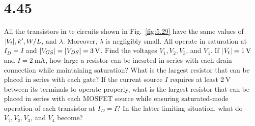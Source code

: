 \documentclass[12pt, a4paper]{article}
\begin{document}
\section{4.45}
All the transistors in te circuits shown in Fig.~\ref{fig:5.29} have the
same values of $\lvert V_t\rvert, k', W/L$, and $\lambda$. Moreover, $\lambda$ is
negligibly small. All operate in saturation at $I_D = I$ and $\abs{V_{GS}}
 = \abs{V_{DS}} = \SI{3}{\V}$. Find the voltages $V_1, V_2, V_3$, and $V_4$.
If $\abs{V_t} = \SI{1}{\V}$ and $I = \SI{2}{\mA}$, how large a resistor can
be inesrted in series with each drain connection while maintaining saturation?
What is the largest resistor that can be placed in series with each gate?
If the current source $I$ requires at least $\SI{2}{\V}$ between its terminals
to operate properly, what is the largest resistor that can be placed in series
with each MOSFET source while ensuring saturated-mode operation of each
transistor at $I_D = I$? In the latter limiting situation, what do $V_1, V_2,
V_3$, and $V_4$ become?
\end{document}
